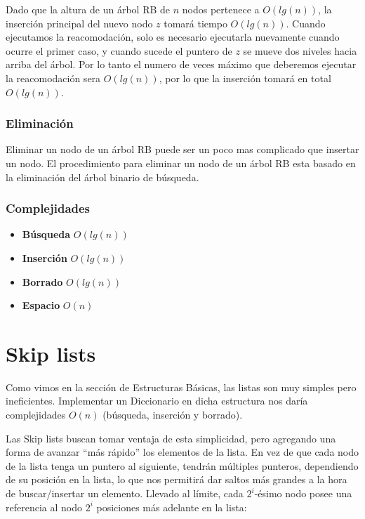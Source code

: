 Dado que la altura de un \'arbol RB de $n$ nodos pertenece a $O(lg(n))$, la inserci\'on principal del nuevo nodo $z$ tomar\'a tiempo $O(lg(n))$. Cuando ejecutamos la reacomodaci\'on, solo es necesario ejecutarla nuevamente cuando ocurre el primer caso, y cuando sucede el puntero de $z$ se mueve dos niveles hacia arriba del \'arbol. Por lo tanto el numero de veces m\'aximo que deberemos ejecutar la reacomodaci\'on sera $O(lg(n))$, por lo que la inserci\'on tomar\'a en total $O(lg(n))$.

\subsubsection{Eliminaci\'on}

Eliminar un nodo de un \'arbol RB puede ser un poco mas complicado que insertar un nodo. El procedimiento para eliminar un nodo de un \'arbol RB esta basado en la eliminaci\'on del \'arbol binario de b\'usqueda.


\subsubsection{Complejidades}

\begin{itemize}
 \item \textbf{B\'usqueda} $O(lg(n))$
 \item \textbf{Inserci\'on} $O(lg(n))$
 \item \textbf{Borrado} $O(lg(n))$
 \item \textbf{Espacio} $O(n)$
\end{itemize}

\newpage
\section{Skip lists}

Como vimos en la secci\'on de Estructuras B\'asicas, las listas son muy simples pero ineficientes. Implementar un Diccionario en dicha estructura nos dar\'ia complejidades $O(n)$ (b\'usqueda, inserci\'on y borrado).

Las Skip lists buscan tomar ventaja de esta simplicidad, pero agregando una forma de avanzar ``m\'as r\'apido'' los elementos de la lista.
En vez de que cada nodo de la lista tenga un puntero al siguiente, tendr\'an m\'ultiples punteros, dependiendo de su posici\'on en la lista, lo que nos permitir\'a dar saltos m\'as grandes a la hora de buscar/insertar un elemento.
Llevado al l\'imite, cada $2^i$-\'esimo nodo posee una referencia al nodo $2^i$ posiciones m\'as adelante en la lista:

